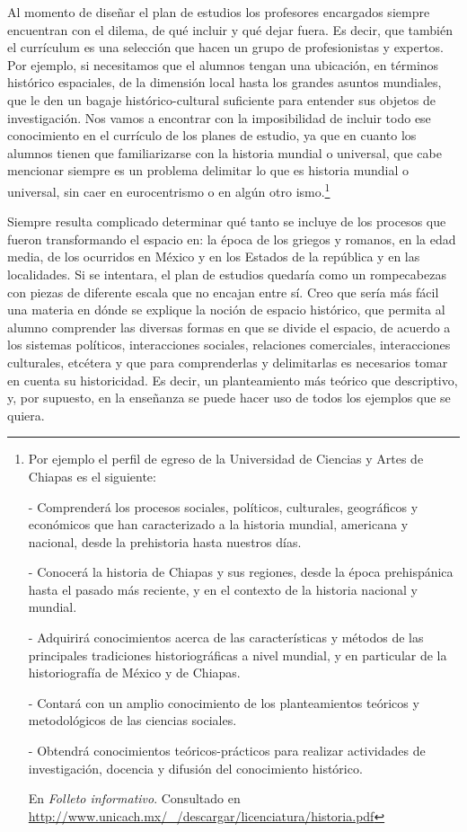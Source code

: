 Al momento de diseñar el plan de estudios los profesores encargados 
siempre encuentran con el dilema, de qué incluir y qué dejar fuera. Es 
decir, que también el currículum es una selección que hacen un grupo de 
profesionistas y expertos. Por ejemplo, si necesitamos que el alumnos 
tengan una ubicación, en términos histórico espaciales, de la dimensión 
local hasta los grandes asuntos mundiales, que le den un bagaje 
histórico-cultural suficiente para entender sus objetos de 
investigación. Nos vamos a encontrar con la imposibilidad de incluir 
todo ese conocimiento en el currículo de los planes de estudio, ya que 
en cuanto los alumnos tienen que familiarizarse con la historia mundial 
o universal, que cabe mencionar siempre es un problema delimitar lo que 
es historia mundial o universal, sin caer en eurocentrismo o en 
algún otro ismo.\footnote{Por ejemplo el perfil de egreso de la 
Universidad de Ciencias y Artes de Chiapas es el siguiente: 
\begin{Obs}
\item[-] Comprenderá los procesos sociales, políticos, culturales, geográficos y 
económicos que han caracterizado a la historia mundial, americana y 
nacional, desde la prehistoria hasta nuestros días. 
\item[-] Conocerá la historia de Chiapas y sus regiones, desde la época prehispánica 
hasta el pasado más reciente, y en el contexto de la historia nacional 
y mundial. 
\item[-] Adquirirá conocimientos acerca de las 
características y métodos de las principales tradiciones 
historiográficas a nivel mundial, y en particular de la historiografía 
de México y de Chiapas. 
\item[-] Contará con un amplio conocimiento 
de los planteamientos teóricos y metodológicos de las ciencias 
sociales. 
\item[-] Obtendrá conocimientos teóricos-prácticos para 
realizar actividades de investigación, docencia y difusión del 
conocimiento histórico.
\end{Obs}

En \textit{Folleto informativo}. Consultado en 
\url{http://www.unicach.mx/_/descargar/licenciatura/historia.pdf} } 


Siempre resulta complicado determinar qué tanto se incluye de los 
procesos que fueron transformando el espacio en: la época de los 
griegos y romanos, en la edad media, de los ocurridos en México y en 
los Estados de la república y en las localidades. Si se intentara, el 
plan de estudios quedaría como un rompecabezas con piezas de diferente 
escala que no encajan entre sí. Creo que sería más fácil una materia en 
dónde se explique la noción de espacio histórico, que permita al alumno 
comprender las diversas formas en que se divide el espacio, de acuerdo 
a los sistemas políticos, interacciones sociales, relaciones 
comerciales, interacciones culturales, etcétera y que para 
comprenderlas y delimitarlas es necesarios tomar en cuenta su 
historicidad. Es decir, un planteamiento más teórico que descriptivo, y, 
por supuesto,  en la enseñanza se puede hacer uso de todos los ejemplos 
que se quiera. 

